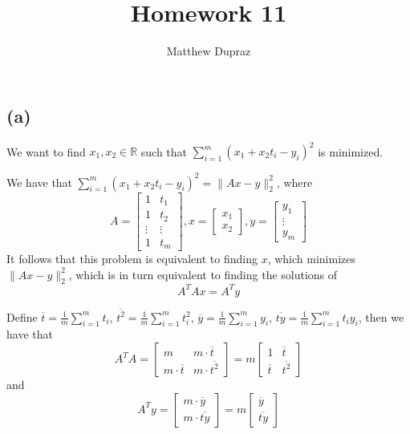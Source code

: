 \documentclass{article}
\author{Matthew Dupraz}
\title{Homework 11}
\newcommand{\R}{\mathbb{R}}
\newcommand{\ol}{\overline}
\begin{document}
\maketitle

\subsection*{(a)}

We want to find $x_1, x_2 \in \R$ such that
$\sum_{i = 1}^m(x_1 + x_2 t_i - y_i)^2$ is minimized.

We have that $\sum_{i=1}^m(x_1 + x_2t_i - y_i)^2 = 
\|Ax - y\|_2^2$, where
\begin{equation*}
	A = 
	\begin{bmatrix}
		1 & t_1 \\
		1 & t_2 \\
		\vdots & \vdots \\
		1 & t_m
	\end{bmatrix},
	x =
	\begin{bmatrix}
		x_1 \\
		x_2
	\end{bmatrix},
	y =
	\begin{bmatrix}
		y_1 \\
		\vdots \\
		y_m
	\end{bmatrix}
\end{equation*}
It follows that this problem is equivalent to
finding $x$, which minimizes $\|Ax - y\|_2^2$, which is
in turn equivalent to finding the solutions of
\begin{equation*}
	A^TAx = A^Ty
\end{equation*}

Define $\ol{t} = \frac{1}{m}\sum_{i = 1}^m t_i$,
$\ol{t^2} = \frac{1}{m}\sum_{i = 1}^m t_i^2$,
$\ol{y} = \frac{1}{m}\sum_{i = 1}^m y_i$,
$\ol{ty} = \frac{1}{m}\sum_{i = 1}^m t_iy_i$,
then we have that
\begin{equation*}
	A^TA =
	\begin{bmatrix}
		m & m \cdot \ol{t} \\
		m \cdot \ol{t} & m \cdot \ol{t^2}
	\end{bmatrix}
	= m
	\begin{bmatrix}
		1 & \ol{t} \\
		\ol{t} & \ol{t^2}
	\end{bmatrix}
\end{equation*}
and
\begin{equation*}
	A^Ty =
	\begin{bmatrix}
		m \cdot \ol{y} \\
		m\cdot \ol{ty}
	\end{bmatrix}
	= m
	\begin{bmatrix}
		\ol{y} \\
		\ol{ty}
	\end{bmatrix}
\end{equation*}
\end{document}
